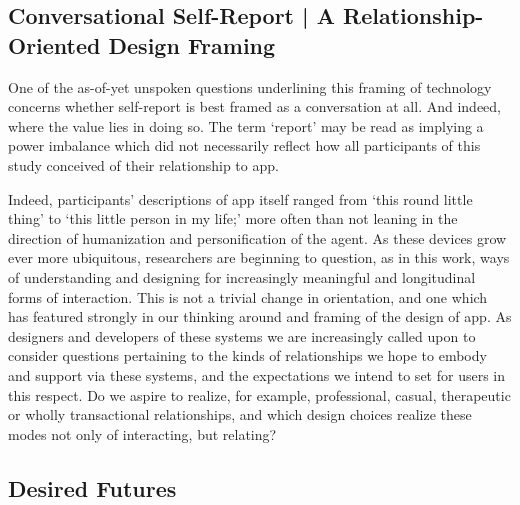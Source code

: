 

    \subsection{Conversational Self-Report | A Relationship-Oriented Design Framing}
    
        One of the as-of-yet unspoken questions underlining this framing of technology concerns whether self-report is best framed as a conversation at all. And indeed, where the value lies in doing so. The term `report' may be read as implying a power imbalance which did not necessarily reflect how all participants of this study conceived of their relationship to \acl{app}. 

        Indeed, participants' descriptions of \acl{app} itself ranged from `this round little thing' to `this little person in my life;' more often than not leaning in the direction of humanization and personification of the agent. As these devices grow ever more ubiquitous, researchers are beginning to question, as in this work, ways of understanding and designing for increasingly meaningful and longitudinal forms of interaction. This is not a trivial change in orientation, and one which has featured strongly in our thinking around and framing of the design of \acl{app}. As designers and developers of these systems we are increasingly called upon to consider questions pertaining to the kinds of relationships we hope to embody and support via these systems, and the expectations we intend to set for users in this respect. Do we aspire to realize, for example, professional, casual, therapeutic or wholly transactional relationships, and which design choices realize these modes not only of interacting, but relating?
   
   
    \subsection{Desired Futures} %
    
